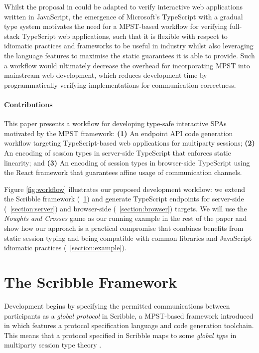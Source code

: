 \documentclass[submission,copyright,creativecommons]{eptcs}
\newcommand{\sectionref}[1]{\textsection~\ref{#1}}
\begin{document}
Whilst the proposal in \cite{Python2017} could be adapted to verify interactive web applications written in JavaScript, the emergence of Microsoft's TypeScript \cite{TypeScript} with a gradual type system motivates the need for a MPST-based workflow for verifying full-stack TypeScript web applications, such that it is flexible with respect to idiomatic practices and frameworks to be useful in industry whilst also leveraging the language features to maximise the static guarantees it is able to provide. Such a workflow would ultimately decrease the overhead for incorporating MPST into mainstream web development, which reduces development time by programmatically verifying implementations for communication correctness.

\paragraph{Contributions}
This paper presents a workflow for developing type-safe interactive SPAs motivated by the MPST framework: \textbf{(1)} An endpoint API code generation workflow targeting TypeScript-based web applications for multiparty sessions; \textbf{(2)} An encoding of session types in server-side TypeScript that enforces static linearity; and \textbf{(3)} An encoding of session types in browser-side TypeScript using the React framework that guarantees affine usage of communication channels.

Figure \ref{fig:workflow} illustrates our proposed development workflow: we extend the Scribble framework (\sectionref{section:scribble}) and generate TypeScript endpoints for server-side (\sectionref{section:server}) and browser-side (\sectionref{section:browser}) targets. We will use the \textit{Noughts and Crosses} game as our running example in the rest of the paper and show how our approach is a practical compromise that combines benefits from static session typing and being compatible with common libraries and JavaScript idiomatic practices (\sectionref{section:example}).

\section{The Scribble Framework}
\label{section:scribble}
Development begins by specifying the permitted communications between participants as a \textit{global protocol} in Scribble, a MPST-based framework introduced in \cite{Scribble} which features a protocol specification language and code generation toolchain. This means that a protocol specified in Scribble maps to some \textit{global type} in multiparty session type theory \cite{MPST}.
\end{document}
